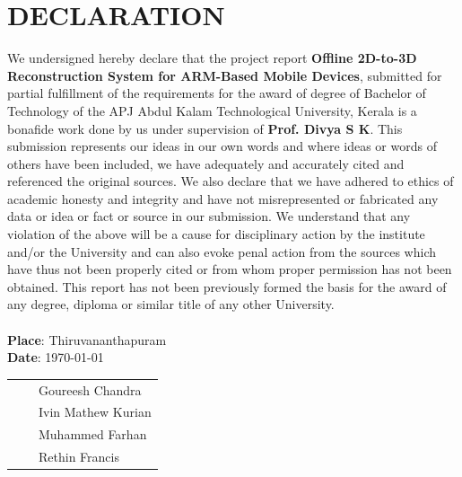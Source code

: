 \section*{\centering DECLARATION}

  We undersigned hereby declare that the project report \textbf{Offline 2D-to-3D Reconstruction System for ARM-Based Mobile Devices}, submitted for partial fulfillment of the requirements for the award of degree of Bachelor of Technology of the APJ Abdul Kalam Technological University, Kerala is a bonafide work done by us under supervision of \textbf{Prof. Divya S K}. This submission represents our ideas in our own words and where ideas or words of others have been included, we have adequately and accurately cited and referenced the original sources. We also declare that we have adhered to ethics of academic honesty and integrity and have not misrepresented or fabricated any data or idea or fact or source in our submission. We understand that any violation of the above will be a cause for disciplinary action by the institute and/or the University and can also evoke penal action from the sources which have thus not been properly cited or from whom proper permission has not been obtained. This report has not been previously formed the basis for the award of any degree, diploma or similar title of any other University. \\ \\
\textbf{Place}: Thiruvananthapuram \\
\textbf{Date}: \today          \\ 
\begin{tabular}{ p{5cm} p{5cm} p{5cm} } 
                                    && Goureesh Chandra \\ 
                                    && Ivin Mathew Kurian \\
                                    && Muhammed Farhan \\
                                    && Rethin Francis \\
\end{tabular}

\newpage